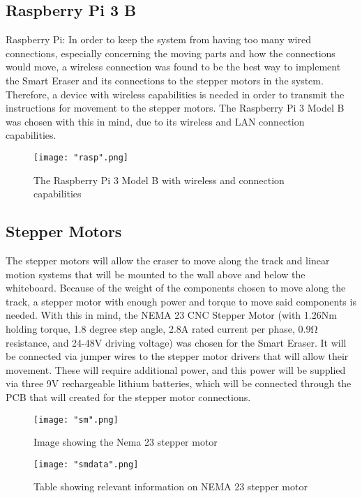 \subsection{Raspberry Pi 3 B}

Raspberry Pi: In order to keep the system from having too many wired connections, especially concerning the moving parts and how the connections would move, a wireless connection was found to be the best way to implement the Smart Eraser and its connections to the stepper motors in the system. Therefore, a device with wireless capabilities is needed in order to transmit the instructions for movement to the stepper motors. The Raspberry Pi 3 Model B was chosen with this in mind, due to its wireless and LAN connection capabilities. 

\begin{figure}[H]
	\centering
	{\texttt{[image: "rasp".png]}}
	\caption{The Raspberry Pi 3 Model B with wireless and connection capabilities\cite{raspB} }
	\label{fig:rasp}
\end{figure}

\subsection{Stepper Motors}
The stepper motors will allow the eraser to move along the track and linear motion systems that will be mounted to the wall above and below the whiteboard. Because of the weight of the components chosen to move along the track, a stepper motor with enough power and torque to move said components is needed. With this in mind, the NEMA 23 CNC Stepper Motor (with 1.26Nm holding torque, 1.8 degree step angle, 2.8A rated current per phase, 0.9Ω resistance, and 24-48V driving voltage) was chosen for the Smart Eraser. It will be connected via jumper wires to the stepper motor drivers that will allow their movement. These will require additional power, and this power will be supplied via three 9V rechargeable lithium batteries, which will be connected through the PCB that will created for the stepper motor connections.

\begin{figure}[H]
	\centering
	{\texttt{[image: "sm".png]}}
	\caption{ Image showing the Nema 23 stepper motor \cite{smR} }
	\label{fig:sm}
\end{figure}

\begin{figure}[H]
	\centering
	{\texttt{[image: "smdata".png]}}
	\caption{Table showing relevant information on NEMA 23 stepper motor\cite{smdataR}}
	\label{fig:smd}
\end{figure}

